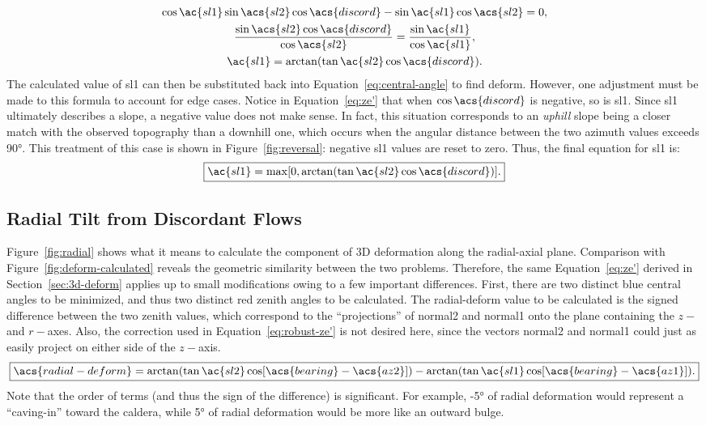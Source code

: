 \begin{gather}
    \cos\ac{sl1}\sin\acs{sl2}
    \cos\acs{discord}-\sin\ac{sl1}\cos\acs{sl2}
    =0,\nonumber\\
    \frac{\sin\acs{sl2}
    \cos\acs{discord}}
    {\cos\acs{sl2}}
    =\frac{\sin\ac{sl1}}{\cos\ac{sl1}},\nonumber\\
    \ac{sl1}
    =\arctan(\tan\ac{sl2}
    \cos\acs{discord}).
    \label{eq:ze'}
\end{gather}
The calculated value of \acs{sl1} can then be substituted back into Equation~\eqref{eq:central-angle} to find \acs{deform}. However, one adjustment must be made to this formula to account for edge cases. Notice in Equation~\eqref{eq:ze'} that when $\cos\acs{discord}$ is negative, so is \acs{sl1}. Since \acs{sl1} ultimately describes a slope, a negative value does not make sense. In fact, this situation corresponds to an \emph{uphill} slope being a closer match with the observed topography than a downhill one, which occurs when the angular distance between the two azimuth values exceeds \ang{90}. This treatment of this case is shown in Figure~\ref{fig:reversal}: negative \acs{sl1} values are reset to zero. Thus, the final equation for \acs{sl1} is:
\begin{equation}
    \boxed{\ac{sl1}
    =\max[0,\arctan(\tan\ac{sl2}
    \cos\acs{discord})].}
    \label{eq:robust-ze'}
\end{equation}

\subsection{Radial Tilt from Discordant Flows}
Figure~\ref{fig:radial} shows what it means to calculate the component of 3D deformation along the radial-axial plane. Comparison with Figure~\ref{fig:deform-calculated} reveals the geometric similarity between the two problems. Therefore, the same Equation~\ref{eq:ze'} derived in Section~\ref{sec:3d-deform} applies up to small modifications owing to a few important differences. First, there are two distinct blue central angles to be minimized, and thus two distinct red zenith angles to be calculated. The \acf{radial-deform} value to be calculated is the signed difference between the two zenith values, which correspond to the ``projections'' of \acs{normal2} and \acs{normal1} onto the plane containing the $z-$ and $r-$axes. Also, the correction used in Equation~\eqref{eq:robust-ze'} is not desired here, since the vectors \acs{normal2} and \acs{normal1} could just as easily project on either side of the $z-$axis.
\begin{equation}
    \boxed{\acs{radial-deform}
    =\arctan(\tan\ac{sl2}
    \cos[\acs{bearing}-\acs{az2}])
    -\arctan(\tan\ac{sl1}
    \cos[\acs{bearing}-\acs{az1}]).}\label{eq:tilt-from-mapping}
\end{equation}
Note that the order of terms (and thus the sign of the difference) is significant. For example, \ang{-5} of radial deformation would represent a ``caving-in'' toward the caldera, while \ang{+5} of radial deformation would be more like an outward bulge.


